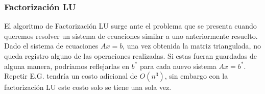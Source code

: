 \subsubsection{Factorización LU}
El algoritmo de Factorización LU surge ante el problema que se presenta cuando queremos resolver un sistema de ecuaciones similar a uno anteriormente resuelto. Dado el sistema de ecuaciones $Ax = b$, una vez obtenida la matriz triangulada, no queda registro alguno de las operaciones realizadas. Si estas fueran guardadas de alguna manera, podríamos reflejarlas en $b^{*}$  para cada nuevo sistema $Ax = b^{*}$. Repetir E.G. tendría un costo adicional de $O(n^{3})$, sin embargo con la factorización LU este costo solo se tiene una sola vez.


